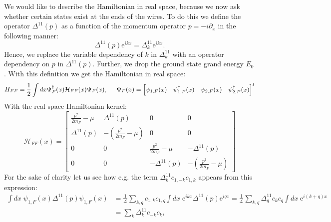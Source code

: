 We would like to describe the Hamiltonian in real space, because we now ask whether certain states exist at the ends of the wires. To do this we define the operator $\Delta^{11}(p)$ as a function of the momentum operator $p = -i\partial_x$ in the following manner:
\begin{equation}
\Delta^{11}(p)\text{e}^{ikx} = \Delta^{11}_k\text{e}^{ikx}.
\label{eq.Deltapdef}
\end{equation}
Hence, we replace the variable dependency of $k$ in $\Delta^{11}_k$ with an operator dependency on $p$ in $\Delta^{11}(p)$. Further, we drop the ground state grand energy $E_0$. With this definition we get the Hamiltonian in real space:
\begin{equation}
H_{FF} = \frac{1}{2}\int dx \Psi^\dagger_{F}(x) \mathcal{H}_{FF}(x) \Psi_{F}(x), \hspace{0.5cm} \Psi_{F}(x) = \begin{bmatrix} \psi_{1,F}(x) & \psi^\dagger_{1,F}(x) & \psi_{2,F}(x) & \psi^\dagger_{2,F}(x)\end{bmatrix}^t
\label{eq.2wiresMFHamiltonianrealspace}
\end{equation}
With the real space Hamiltonian kernel:
\begin{equation}
\mathcal{H}_{FF}(x) = \begin{bmatrix} 
\frac{p^2}{2m_F} - \mu & \Delta^{11}(p) & 0 & 0 \\
\Delta^{11}(p) & -\left(\frac{p^2}{2m_F} - \mu \right) & 0 & 0 \\
0 & 0 & \frac{p^2}{2m_F} - \mu & -\Delta^{11}(p) \\
0 & 0 & -\Delta^{11}(p) & -\left(\frac{p^2}{2m_F} - \mu \right)
\end{bmatrix}
\label{eq.2wiresMFHamiltonianrealspacefirstquantization}
\end{equation}
For the sake of clarity let us see how e.g. the term $\Delta^{11}_kc_{1,-k}c_{1,k}$ appears from this expression:
\begin{align}
\int dx \; \psi_{1,F}(x) \Delta^{11}(p) \psi_{1,F}(x) &= \frac{1}{\mathcal{L}}\sum_{k,q}c_{1,k} c_{1,q}\int dx \; \text{e}^{ikx}\Delta^{11}(p)\text{e}^{iqx} = \frac{1}{\mathcal{L}}\sum_{k,q}\Delta^{11}_qc_kc_q\int dx \; \text{e}^{i(k + q)x} \nonumber \\
&= \sum_{k}\Delta^{11}_kc_{-k}c_k, \nonumber 
\end{align}
